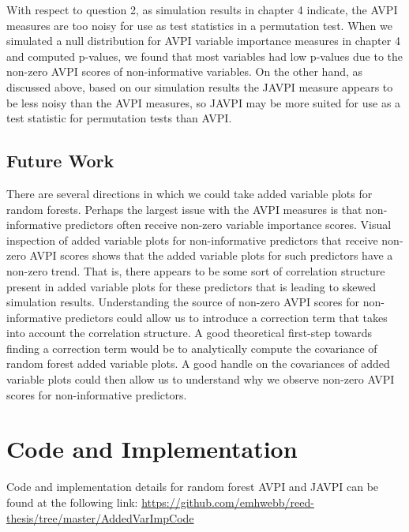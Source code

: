 \documentclass[12pt,twoside]{reedthesis}
\theoremstyle{definition}
\theoremstyle{definition}
\theoremstyle{definition}
\theoremstyle{remark}
\begin{document}
With respect to question 2, as simulation results in chapter 4 indicate,
the AVPI measures are too noisy for use as test statistics in a
permutation test. When we simulated a null distribution for AVPI
variable importance measures in chapter 4 and computed p-values, we
found that most variables had low p-values due to the non-zero AVPI
scores of non-informative variables. On the other hand, as discussed
above, based on our simulation results the JAVPI measure appears to be
less noisy than the AVPI measures, so JAVPI may be more suited for use
as a test statistic for permutation tests than AVPI. \par 

\section{Future Work}\label{future-work}

There are several directions in which we could take added variable plots
for random forests. Perhaps the largest issue with the AVPI measures is
that non-informative predictors often receive non-zero variable
importance scores. Visual inspection of added variable plots for
non-informative predictors that receive non-zero AVPI scores shows that
the added variable plots for such predictors have a non-zero trend. That
is, there appears to be some sort of correlation structure present in
added variable plots for these predictors that is leading to skewed
simulation results. Understanding the source of non-zero AVPI scores for
non-informative predictors could allow us to introduce a correction term
that takes into account the correlation structure. A good theoretical
first-step towards finding a correction term would be to analytically
compute the covariance of random forest added variable plots. A good
handle on the covariances of added variable plots could then allow us to
understand why we observe non-zero AVPI scores for non-informative
predictors. \par

\appendix

\chapter{Code and Implementation}\label{code-and-implementation}

Code and implementation details for random forest AVPI and JAVPI can be
found at the following link:
\url{https://github.com/emhwebb/reed-thesis/tree/master/AddedVarImpCode}
\end{document}
